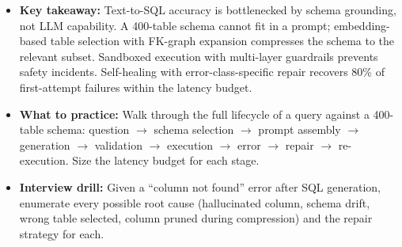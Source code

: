 \begin{itemize}
  \item \textbf{Key takeaway:} Text-to-SQL accuracy is bottlenecked by schema grounding, not LLM capability. A 400-table schema cannot fit in a prompt; embedding-based table selection with FK-graph expansion compresses the schema to the relevant subset. Sandboxed execution with multi-layer guardrails prevents safety incidents. Self-healing with error-class-specific repair recovers 80\% of first-attempt failures within the latency budget.
  \item \textbf{What to practice:} Walk through the full lifecycle of a query against a 400-table schema: question $\rightarrow$ schema selection $\rightarrow$ prompt assembly $\rightarrow$ generation $\rightarrow$ validation $\rightarrow$ execution $\rightarrow$ error $\rightarrow$ repair $\rightarrow$ re-execution. Size the latency budget for each stage.
  \item \textbf{Interview drill:} Given a ``column not found'' error after SQL generation, enumerate every possible root cause (hallucinated column, schema drift, wrong table selected, column pruned during compression) and the repair strategy for each.
\end{itemize}

